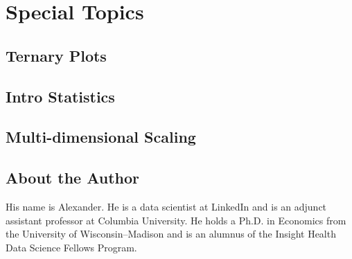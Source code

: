 \documentclass{tex/kdp} %
\begin{document}
\part{Special Topics}\label{part:topics}

\chapter{Ternary Plots}\label{chapter:ternary}


\chapter{Intro Statistics}\label{chapter:stats}


\chapter{Multi-dimensional Scaling}\label{chapter:mds}




\backmatter
\printbibliography
\chapter*{About the Author}
His name is Alexander. He is a data scientist at LinkedIn and is an adjunct assistant professor at Columbia University. He holds a Ph.D. in Economics from the University of Wisconsin–Madison and is an alumnus of the Insight Health Data Science Fellows Program. \faHandPeaceO
\end{document}
